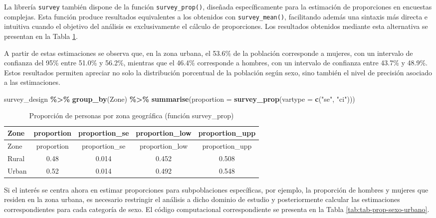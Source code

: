 \documentclass[
  spanish,
  12pt,
]{book}
\newenvironment{Shaded}{\begin{snugshade}}{\end{snugshade}}
\newcommand{\AttributeTok}[1]{\textcolor[rgb]{0.13,0.29,0.53}{#1}}
\newcommand{\FunctionTok}[1]{\textcolor[rgb]{0.13,0.29,0.53}{\textbf{#1}}}
\newcommand{\NormalTok}[1]{#1}
\newcommand{\SpecialCharTok}[1]{\textcolor[rgb]{0.81,0.36,0.00}{\textbf{#1}}}
\newcommand{\StringTok}[1]{\textcolor[rgb]{0.31,0.60,0.02}{#1}}
\begin{document}
La librería \texttt{survey} también dispone de la función \texttt{survey\_prop()}, diseñada específicamente para la estimación de proporciones en encuestas complejas. Esta función produce resultados equivalentes a los obtenidos con \texttt{survey\_mean()}, facilitando además una sintaxis más directa e intuitiva cuando el objetivo del análisis es exclusivamente el cálculo de proporciones. Los resultados obtenidos mediante esta alternativa se presentan en la Tabla \ref{tab:tab-prop-zona2}.

A partir de estas estimaciones se observa que, en la zona urbana, el 53.6\% de la población corresponde a mujeres, con un intervalo de confianza del 95\% entre 51.0\% y 56.2\%, mientras que el 46.4\% corresponde a hombres, con un intervalo de confianza entre 43.7\% y 48.9\%. Estos resultados permiten apreciar no solo la distribución porcentual de la población según sexo, sino también el nivel de precisión asociado a las estimaciones.

\begin{Shaded}
\begin{Highlighting}[]
\NormalTok{survey\_design }\SpecialCharTok{\%\textgreater{}\%}
  \FunctionTok{group\_by}\NormalTok{(Zone) }\SpecialCharTok{\%\textgreater{}\%}
  \FunctionTok{summarise}\NormalTok{(}\AttributeTok{proportion =} \FunctionTok{survey\_prop}\NormalTok{(}\AttributeTok{vartype =} \FunctionTok{c}\NormalTok{(}\StringTok{"se"}\NormalTok{, }\StringTok{"ci"}\NormalTok{)))}
\end{Highlighting}
\end{Shaded}

\begin{longtable}[]{@{}lcccc@{}}
\caption{\label{tab:tab-prop-zona2}Proporción de personas por zona geográfica (función survey\_prop)}\tabularnewline
\toprule\noalign{}
Zone & proportion & proportion\_se & proportion\_low & proportion\_upp \\
\midrule\noalign{}
\endfirsthead
\toprule\noalign{}
Zone & proportion & proportion\_se & proportion\_low & proportion\_upp \\
\midrule\noalign{}
\endhead
\bottomrule\noalign{}
\endlastfoot
Rural & 0.48 & 0.014 & 0.452 & 0.508 \\
Urban & 0.52 & 0.014 & 0.492 & 0.548 \\
\end{longtable}

Si el interés se centra ahora en estimar proporciones para subpoblaciones específicas, por ejemplo, la proporción de hombres y mujeres que residen en la zona urbana, es necesario restringir el análisis a dicho dominio de estudio y posteriormente calcular las estimaciones correspondientes para cada categoría de sexo. El código computacional correspondiente se presenta en la Tabla \ref{tab:tab-prop-sexo-urbano}.
\end{document}
